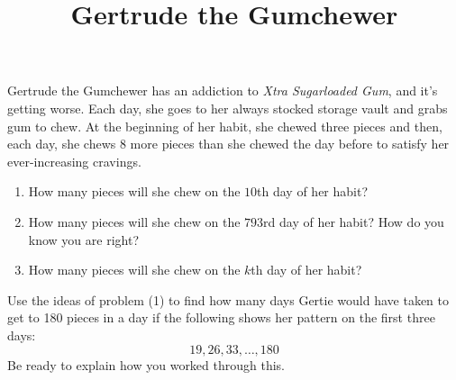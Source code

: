 \documentclass[noauthor,nooutcomes,handout]{ximera}
\title{Gertrude the Gumchewer }
\begin{document}
\begin{abstract}
    
\end{abstract}
\maketitle


\begin{problem}
Gertrude the Gumchewer has an addiction to \textit{Xtra Sugarloaded
  Gum}, and it's getting worse.  Each day, she goes to her always
stocked storage vault and grabs gum to chew.  At the beginning of her
habit, she chewed three pieces and then, each day, she chews 8 more
pieces than she chewed the day before to satisfy her ever-increasing
cravings.
\begin{enumerate}
\item How many pieces will she chew on the $10$th day of her habit?
\item How many pieces will she chew on the $793$rd day of her habit? How do you know you are right?
\item How many pieces will she chew on the $k$th day of her habit?
\end{enumerate}
\end{problem}



\vskip 2in


\begin{problem}
Use the ideas of problem (1) to find how many days Gertie would have taken to get to 180 pieces in a day if the following shows her pattern on the first three days:
\[
19, 26, 33, \dots , 180
\]
Be ready to explain how you worked through this.  
\end{problem}


\pagebreak
\end{document}
